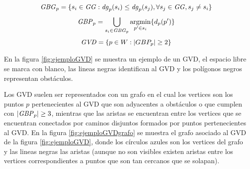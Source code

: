 \begin{equation}
  \mathit{GBG}_p = \{s_i \in \mathit{GG}: \mathit{dg}_p(s_i) \leq \mathit{dg}_p(s_j), \forall s_j\in \mathit{GG}, s_j \neq s_i\}\label{eq:GBS}
\end{equation}
\begin{equation}
  \mathit{GBP}_p =\bigcup_{s_i \in \mathit{GBG}_p} \operatorname*{argmin}_{p'\in s_i}\{d_p(p')\}\label{eq:GBP}
\end{equation}
\begin{equation}
  \mathit{GVD}  = \{p \in W : |GBP_p| \geq 2\}\label{eq:GVD}
\end{equation}

En la figura \ref{fig:ejemploGVD} se muestra un ejemplo de un GVD, el espacio libre se marca con blanco, las lineas negras identifican al GVD y los polígonos negros representan obstáculos. 

Los GVD suelen ser representados con un grafo en el cual los vertices son los puntos $p$ pertenecientes al GVD que son adyacentes a obstáculos o que cumplen con $|\mathit{GBP}_p|\geq 3$, mientras que las aristas se encuentran entre los vertices que se encuentran conectados por caminos disjuntos formados por puntos pertenecientes al GVD. En la figura \ref{fig:ejemploGVDgrafo} se muestra el grafo asociado al GVD de la figura \ref{fig:ejemploGVD}, donde los círculos azules son los vertices del grafo y las lineas negras las aristas (aunque no son visibles existen aristas entre los vertices correspondientes a puntos que son tan cercanos que se solapan).

